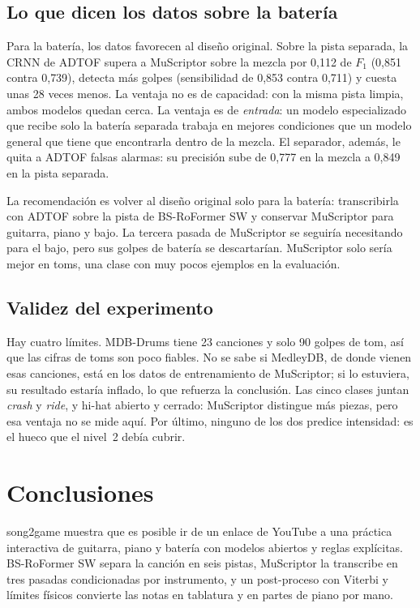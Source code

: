 \documentclass[11pt,a4paper]{article}
\begin{document}
\subsection{Lo que dicen los datos sobre la batería}
Para la batería, los datos favorecen al diseño original. Sobre la pista separada, la CRNN de ADTOF supera
a MuScriptor sobre la mezcla por 0{,}112 de $F_1$ (0{,}851 contra 0{,}739), detecta más golpes
(sensibilidad de 0{,}853 contra 0{,}711) y cuesta unas 28 veces menos. La ventaja no es de capacidad: con la
misma pista limpia, ambos modelos quedan cerca. La ventaja es de \emph{entrada}: un modelo especializado
que recibe solo la batería separada trabaja en mejores condiciones que un modelo general que tiene que
encontrarla dentro de la mezcla. El separador, además, le quita a ADTOF falsas alarmas: su precisión sube
de 0{,}777 en la mezcla a 0{,}849 en la pista separada.

La recomendación es volver al diseño original solo para la batería: transcribirla con ADTOF sobre la
pista de BS-RoFormer SW y conservar MuScriptor para guitarra, piano y bajo. La tercera pasada de
MuScriptor se seguiría necesitando para el bajo, pero sus golpes de batería se descartarían. MuScriptor
solo sería mejor en toms, una clase con muy pocos ejemplos en la evaluación.

\subsection{Validez del experimento}
Hay cuatro límites. MDB-Drums tiene 23 canciones y solo 90 golpes de tom, así que las cifras de toms son
poco fiables. No se sabe si MedleyDB, de donde vienen esas canciones, está en los datos de entrenamiento
de MuScriptor; si lo estuviera, su resultado estaría inflado, lo que refuerza la conclusión. Las cinco
clases juntan \emph{crash} y \emph{ride}, y hi-hat abierto y cerrado: MuScriptor distingue más piezas, pero
esa ventaja no se mide aquí. Por último, ninguno de los dos predice intensidad: es el hueco que el nivel~2
debía cubrir.

\section{Conclusiones}

song2game muestra que es posible ir de un enlace de YouTube a una práctica interactiva de guitarra, piano
y batería con modelos abiertos y reglas explícitas. BS-RoFormer SW separa la canción en seis pistas,
MuScriptor la transcribe en tres pasadas condicionadas por instrumento, y un post-proceso con Viterbi y
límites físicos convierte las notas en tablatura y en partes de piano por mano.
\end{document}
